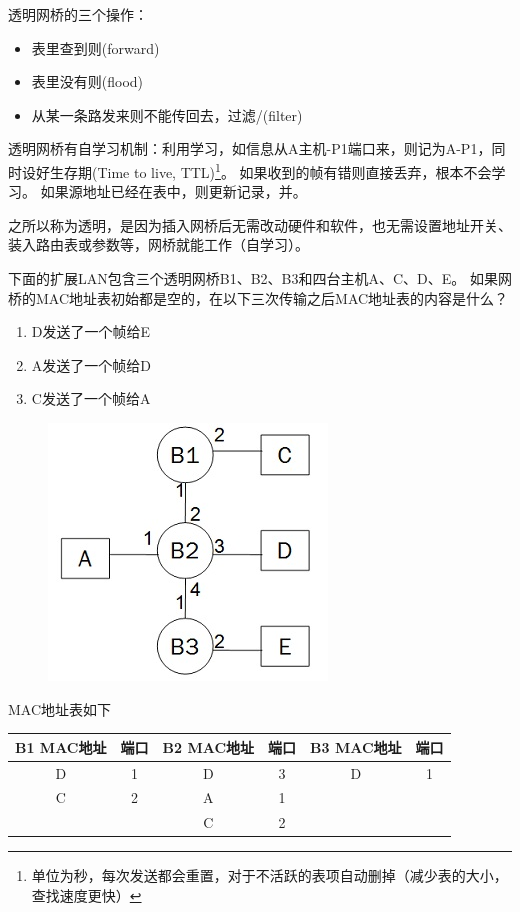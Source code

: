 透明网桥的三个操作：
\begin{itemize}
	\item 表里查到则\underline{}(forward)
	\item 表里没有则\underline{}(flood)
	\item 从某一条路发来则不能传回去，过滤/\underline{}(filter)
\end{itemize}

透明网桥有自学习机制：利用学习，如信息从A主机-P1端口来，则记为A-P1，同时设好生存期(Time to live, TTL)\footnote{单位为秒，每次发送都会重置，对于不活跃的表项自动删掉（减少表的大小，查找速度更快）}。
如果收到的帧有错则直接丢弃，根本不会学习。
如果源地址已经在表中，则更新记录，并。

之所以称为透明，是因为插入网桥后无需改动硬件和软件，也无需设置地址开关、装入路由表或参数等，网桥就能工作（自学习）。

\begin{example}
	下面的扩展LAN包含三个透明网桥B1、B2、B3和四台主机A、C、D、E。
	如果网桥的MAC地址表初始都是空的，在以下三次传输之后MAC地址表的内容是什么？
	\begin{enumerate}
	\item D发送了一个帧给E
	\item A发送了一个帧给D
	\item C发送了一个帧给A
	\end{enumerate}
	\begin{figure}[H]
		\centering
		\includegraphics[width=0.25\linewidth]{fig/mac_address.jpg}
	\end{figure}
\end{example}
\begin{analysis}
	MAC地址表如下
	\begin{center}
		\begin{tabular}{cc|cc|cc}\hline
			B1 MAC地址 & 端口 & B2 MAC地址 & 端口 & B3 MAC地址 & 端口\\\hline
			D & 1 & D & 3 & D & 1\\
			C & 2 & A & 1 & & \\
			& & C & 2 & & \\\hline
		\end{tabular}
	\end{center}
\end{analysis}

